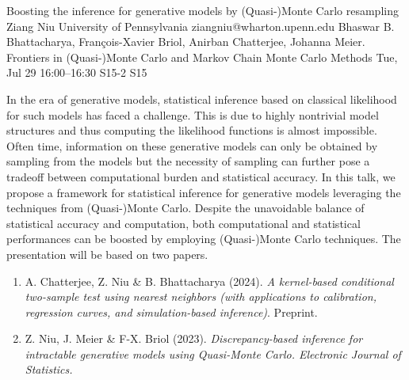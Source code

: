 \documentclass[12pt,lettersize,oneside]{book} %
\begin{document}
\begin{talk}
  {Boosting the inference for generative models by (Quasi-)Monte Carlo resampling}%
  {Ziang Niu}%
  {University of Pennsylvania}%
  {ziangniu@wharton.upenn.edu}%
  {Bhaswar B. Bhattacharya, Fran\c{c}ois-Xavier Briol, Anirban Chatterjee, Johanna Meier.}%
  {Frontiers in (Quasi-)Monte Carlo and Markov Chain Monte Carlo Methods}%
  {Tue, Jul 29 16:00--16:30}%
  {S15-2}%
  {S15}%
    
   
In the era of generative models, statistical inference based on classical likelihood for such models has faced a challenge. This is due to highly nontrivial model structures and thus computing the likelihood functions is almost impossible. Often time, information on these generative models can only be obtained by sampling from the models but the necessity of sampling can further pose a tradeoff between computational burden and statistical accuracy. In this talk, we propose a framework for statistical inference for generative models leveraging the techniques from (Quasi-)Monte Carlo. Despite the unavoidable balance of statistical accuracy and computation, both computational and statistical performances can be boosted by employing (Quasi-)Monte Carlo techniques. The presentation will be based on two papers.

\begin{enumerate}
 \item[{[1]}] A. Chatterjee, Z. Niu \& B. Bhattacharya (2024). {\it A kernel-based conditional two-sample test using nearest neighbors (with applications to calibration, regression curves, and simulation-based inference)}. Preprint.
 \item[{[2]}] Z. Niu, J. Meier \& F-X. Briol (2023). \it{Discrepancy-based inference for
  intractable generative models using
  Quasi-Monte Carlo.} Electronic Journal of Statistics.
\end{enumerate}

\medskip

\end{talk}
\end{document}
